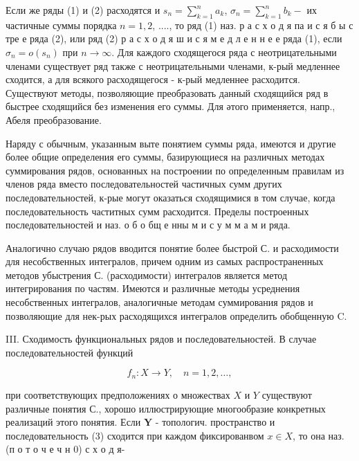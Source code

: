 \documentclass[10pt]{article}
\begin{document}
Если же ряды (1) и (2) расходятся и $s_{n}=\sum_{k=1}^{n} a_{k}$, $\sigma_{n}=\sum_{k=1}^{n} b_{k}-$ их частичные суммы порядка $n=1,2$, ...., то ряд (1) наз. р а с х о д я па и с я б ы с тре е ряда (2), или ряд (2) р а с х о д я ш и с я м е д л е н н е е ряда (1), если $\sigma_{n}=o\left(s_{n}\right)$ при $n \rightarrow \infty$. Для каждого сходящегося ряда с неотрицательными членами существует ряд также с неотрицательными членами, к-рый медленнее сходится, а для всякого расходящегося - к-рый медленнее расходится. Существуют методы, позволяющие преобразовать данный сходящийся ряд в быстрее сходящийся без изменения его суммы. Для әтого применяется, напр., Абеля преобразование.



Наряду с обычным, указанным выте понятием суммы ряда, имеются и другие более общие определения его суммы, базирующиеся на различных методах суммирования рядов, основанных на построении по определенным правилам из членов ряда вместо последовательностей частичных сумм других последовательностей, к-рые могут оказаться сходящимися в том случае, когда последовательность частитных сумм расходится. Пределы построенных последовательностей и наз. о б о бщ е нны м и с у м м а м и ряда.



Аналогично случаю рядов вводится понятие более быстрой С. и расходимости для несобственных интегралов, причем одним из самых распространенных методов убыстрения С. (расходимости) интегралов является метод интегрирования по частям. Имеются и различные методы усреднения несобственных интегралов, аналогичные методам суммирования рядов и позволяющие для нек-рых расходящихся интегралов определить обобщенную $\mathrm{C}$.



III. Сходимость функциональных рядов и последовательностей. В случае последовательностей функций



\[

f_{n}: X \longrightarrow Y, \quad n=1,2, \ldots,

\]



при соответствующих предположениях о множествах $X$ и $Y$ существуют различные понятия С., хорошо иллюстрирующие многообразие конкретных реализаций этого понятия. Если $\boldsymbol{Y}$ - топологич. пространство и последовательность (3) сходится при каждом фиксированвом $x \in X$, то она наз. (п о т о ч е ч н 0) с х о д я-
\end{document}
